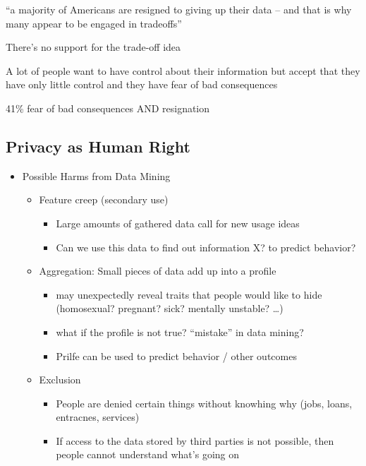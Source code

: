 \documentclass[a4paper,12pt]{scrartcl}
\begin{document}
\begin{itemize}
		\enquote{a majority of Americans are resigned to giving up their data -- and that is why many appear to be engaged in tradeoffs}
		 
		There's no support for the trade-off idea

		A lot of people want to have control about their information but accept that they have only little control and they have fear of bad consequences

		41\% fear of bad consequences AND resignation
\end{itemize}

\subsection{Privacy as Human Right}
\begin{itemize}
	\item
		Possible Harms from Data Mining
		\begin{itemize}
			\item
				Feature creep (secondary use)
				\begin{itemize}
					\item
						Large amounts of gathered data call for new usage ideas
					\item
						Can we use this data to find out information X? to predict behavior?
				\end{itemize}
			\item
				Aggregation: Small pieces of data add up into a profile
				\begin{itemize}
					\item
						may unexpectedly reveal traits that people would like to hide (homosexual? pregnant? sick? mentally unstable? \dots)
					\item
						what if the profile is not true? \enquote{mistake} in data mining?
					\item
						Prilfe can be used to predict behavior / other outcomes
				\end{itemize}
			\item
				Exclusion
				\begin{itemize}
					\item
						People are denied certain things without knowhing why (jobs, loans, entracnes, services)
					\item
						If access to the data stored by third parties is not possible, then people cannot understand what's going on
				\end{itemize}


\end{itemize}
\end{itemize}
\end{document}
